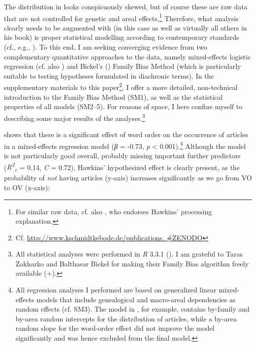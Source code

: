 \documentclass[output=paper]{langsci/langscibook}
\begin{document}
The distribution in  looks conspicuously skewed, but of course these are raw data that are not controlled for genetic and areal effects.\footnote{For similar raw data, cf. also \citet{Dryer2009}, who endorses Hawkins’ processing explanation.} Therefore, what  analysis clearly needs to be augmented with (in this case as well as virtually all others in his book) is proper statistical modelling according to contemporary standards (cf., e.g., \citealt{Bickel2011}). To this end, I am seeking converging evidence from two complementary quantitative approaches to the data, namely mixed-effects logistic regression (cf. also \citealt{Cysouw2010,JaegerEtAl2011}) and Bickel’s (\citeyear{Bickel2011,Bickel2013}) Family Bias Method (which is particularly suitable to testing hypotheses formulated in diachronic terms). In the supplementary materials to this paper\footnote{Cf. \url{http://www.kschmidtkebode.de/publications. #ZENODO}}, I offer a more detailed, non-technical introduction to the Family Bias Method (SM1), as well as the statistical properties of all models (SM2–5). For reasons of space, I here confine myself to describing some major results of the analyses.\footnote{All statistical analyses were performed in \textit{R} 3.3.1 (\citealt{RTeam2016}). I am grateful to Taras Zakharko and Balthasar Bickel for making their Family Bias algorithm freely available (\citealt{ZakharkoBickel2011}+).}

 shows that there is a significant effect of word order on the occurrence of articles in a mixed-effects regression model (\textit{β} = -0.73, \textit{p} < 0.001).\footnote{All regression analyses I performed are based on generalized linear mixed-effects models that include genealogical and macro-areal dependencies as random effects (cf. SM3). The model in , for example, contains by-family and by-area random intercepts for the distribution of articles, while a by-area random slope for the word-order effect did not improve the model significantly and was hence excluded from the final model.} Although the model is not particularly good overall, probably missing important further predictors (\textit{R\textsuperscript{2}}\textit{\textsubscript{c}} = 0.14, \textit{C} = 0.72), Hawkins’ hypothesized effect is clearly present, as the probability of \textit{not} having articles (y-axis) increases significantly as we go from VO to OV (x-axis):

  
\end{document}
